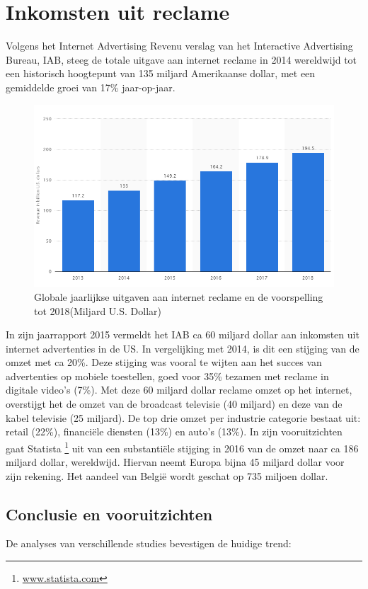 \documentclass[pdftex,a4paper,12pt,twoside]{report}
\begin{document}
\section{Inkomsten uit reclame}
\label{sec:Inkomsten uit reclame}
Volgens het Internet Advertising Revenu verslag \cite{Silverman2015} van het Interactive Advertising Bureau, IAB, steeg de totale uitgave aan internet reclame in 2014 wereldwijd tot een historisch hoogtepunt van 135 miljard Amerikaanse dollar, met een gemiddelde groei van 17\% jaar-op-jaar.
\begin{figure}[h!]
\centering
\includegraphics[width=12cm]{img/AdvertisingRevenueYearly}
\caption{Globale jaarlijkse uitgaven aan internet reclame en de voorspelling tot 2018(Miljard U.S. Dollar)}
\label{fig: AdvertisingRevenueYearly}
\end{figure} 
In zijn jaarrapport 2015 vermeldt het IAB ca 60 miljard dollar aan inkomsten uit internet advertenties in de US. In vergelijking met 2014, is dit een stijging van de omzet met ca 20\%. Deze stijging was vooral te wijten aan het succes van advertenties op mobiele toestellen, goed voor 35\% tezamen met reclame in digitale video’s (7\%). 
Met deze 60 miljard dollar reclame omzet op het internet, overstijgt het de omzet van de broadcast televisie (40 miljard) en deze van de kabel televisie (25 miljard).
De top drie omzet per industrie categorie bestaat uit: retail (22\%), financiële diensten (13\%) en auto’s (13\%). 
In zijn vooruitzichten gaat Statista \footnote{\url{www.statista.com}} uit van een substantiële stijging in 2016 van de omzet naar ca 186 miljard dollar, wereldwijd. Hiervan neemt Europa bijna 45 miljard dollar voor zijn rekening. Het aandeel van België wordt geschat op 735 miljoen dollar.

\subsection{Conclusie en vooruitzichten }
\label{Conclusie en vooruitzichten }
De analyses van verschillende studies \citep{Silverman2015,BI-Insider2016, EMarketer2016, pwc2015} bevestigen de huidige trend:
\end{document}
